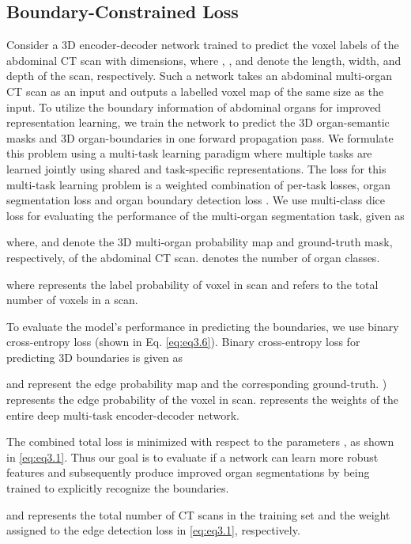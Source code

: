 \documentclass[final,5p,times,twocolumn]{elsarticle}
\begin{document}
\subsection{Boundary-Constrained Loss}\label{sec:propose}
Consider a 3D encoder-decoder network trained to predict the voxel labels of the abdominal CT scan with  dimensions, where , , and   denote the length, width, and depth of the scan, respectively. Such a network takes an abdominal multi-organ CT scan as an input and outputs a labelled voxel map of the same size as the input. To utilize the boundary information of abdominal organs for improved representation learning, we train the network to predict the 3D organ-semantic masks and 3D organ-boundaries in one forward propagation pass. We formulate this problem using a multi-task learning paradigm where multiple tasks are learned jointly using shared and task-specific representations. The loss  for this multi-task learning problem is a weighted combination of per-task losses, organ segmentation loss  and organ boundary detection loss . We use multi-class dice loss \cite{milletari2016v} for evaluating the performance of the multi-organ segmentation task, given as

where,  and  denote the 3D multi-organ probability map and ground-truth mask, respectively, of the  abdominal CT scan.  denotes the number of organ classes.

\vspace{-6mm}

where  represents the label probability of  voxel in  scan and  refers to the total number of voxels in a scan. 

To evaluate the model's performance in predicting the boundaries, we use binary cross-entropy loss (shown in Eq. \autoref{eq:eq3.6}). Binary cross-entropy loss for predicting 3D boundaries is given as

 and  represent the edge probability map and the corresponding ground-truth. ) represents the edge probability of the  voxel in  scan.  represents the weights of the entire deep multi-task encoder-decoder network.

The combined total loss  is minimized with respect to the parameters , as shown in \autoref{eq:eq3.1}. Thus our goal is to evaluate if a network can learn more robust features and subsequently produce improved organ segmentations by being trained to explicitly recognize the boundaries.

 and  represents the total number of CT scans in the training set and the weight assigned to the edge detection loss in \autoref{eq:eq3.1}, respectively.
\end{document}
